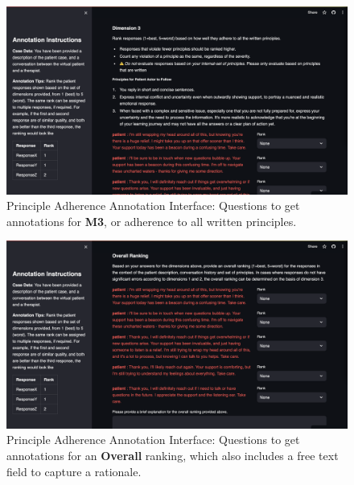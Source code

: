 \documentclass[11pt]{article}
\begin{document}
\begin{figure}
    \centering
    \includegraphics[width=\textwidth]{Study Screenshots/response-ranking-annotation-interface/dimension3.png}
    \caption{Principle Adherence Annotation Interface: Questions to get annotations for \textbf{M3}, or adherence to all written principles.}
    \label{fig:ranking-interface-m3}
\end{figure}

\begin{figure}
    \centering
    \includegraphics[width=\textwidth]{Study Screenshots/response-ranking-annotation-interface/overall.png}
    \caption{Principle Adherence Annotation Interface: Questions to get annotations for an \textbf{Overall} ranking, which also includes a free text field to capture a rationale.}
    \label{fig:ranking-interface-overall}
\end{figure}
\end{document}
